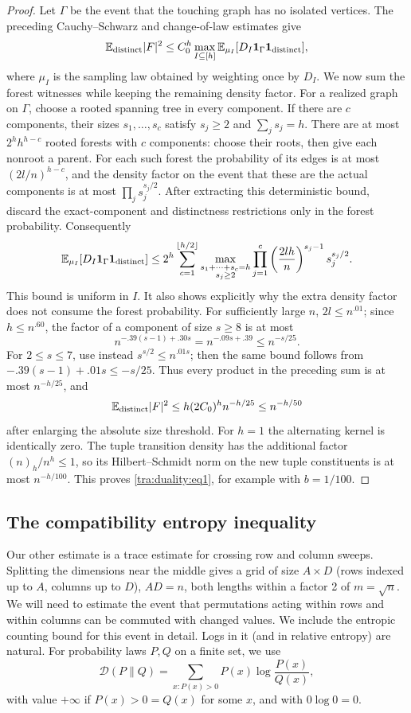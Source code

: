 \begin{proof}
Let $\Gamma$ be the event that the touching graph has no isolated
vertices. The preceding Cauchy--Schwarz and change-of-law estimates give
\[
 \mathbb E_{\rm distinct}|F|^2
 \le C_0^h\max_{I\subseteq[h]}
       \mathbb E_{\mu_I}[D_I\mathbf1_\Gamma\mathbf1_{\rm distinct}],
\]
where $\mu_I$ is the sampling law obtained by weighting once by $D_I$.
We now sum the forest witnesses while keeping the remaining density
factor. For a realized graph on $\Gamma$, choose a rooted spanning
tree in every component. If there are $c$ components, their sizes
$s_1,\ldots,s_c$ satisfy $s_j\ge2$ and $\sum_js_j=h$.
There are at most $2^h h^{h-c}$ rooted forests with $c$ components:
choose their roots, then give each nonroot a parent. For each such
forest the probability of its edges is at most $(2l/n)^{h-c}$,
and the density factor on the event that these are the actual
components is at most $\prod_js_j^{s_j/2}$. After extracting this deterministic bound, discard the exact-component
and distinctness restrictions only in the forest probability. Consequently
\[
 \mathbb E_{\mu_I}[D_I\mathbf1_\Gamma\mathbf1_{\rm distinct}]
 \le 2^h\sum_{c=1}^{\lfloor h/2\rfloor}
    \max_{\substack{s_1+\cdots+s_c=h\\s_j\ge2}}
       \prod_{j=1}^c
       \left(\frac{2lh}{n}\right)^{s_j-1}s_j^{s_j/2}.
\]
This bound is uniform in $I$. It also shows explicitly why the
extra density factor does not consume the forest probability.
For sufficiently large $n$, $2l\le n^{.01}$; since $h\le n^{.60}$,
the factor of a component of size $s\ge8$ is at most
\[
 n^{-.39(s-1)+.30s}
   =n^{-.09s+.39}\le n^{-s/25}.
\]
For $2\le s\le7$, use instead $s^{s/2}\le n^{.01s}$;
then the same bound follows from
$-.39(s-1)+.01s\le-s/25$. Thus every product in the preceding
sum is at most $n^{-h/25}$, and
\[
 \mathbb E_{\rm distinct}|F|^2
 \le h(2C_0)^h n^{-h/25}\le n^{-h/50}
\]
after enlarging the absolute size threshold. For $h=1$ the
alternating kernel is identically zero. The tuple transition
density has the additional factor $(n)_h/n^h\le1$, so its
Hilbert--Schmidt norm on the new tuple constituents is at most
$n^{-h/100}$. This proves \eqref{tra:duality:eq1}, for example
with $b=1/100$.
\end{proof}
\subsection{The compatibility entropy inequality}
\label{tra:duality:grid-definition}
Our other estimate is a trace estimate for crossing row and column sweeps. Splitting the dimensions near the middle gives a grid of size \(A\times D\) (rows indexed up to \(A\), columns up to \(D\)), \(AD=n\), both lengths within a factor 2 of \(m=\sqrt n\). We will need to estimate the event that permutations acting within rows and within columns can be commuted with changed values. We include the entropic counting bound for this event in detail. Logs in it (and in relative entropy) are natural. For probability laws $P,Q$ on a finite set, we use
\[
 \mathcal D(P\|Q)=\sum_{x:P(x)>0}P(x)\log\frac{P(x)}{Q(x)},
\]
with value $+\infty$ if $P(x)>0=Q(x)$ for some $x$, and with $0\log0=0$.

